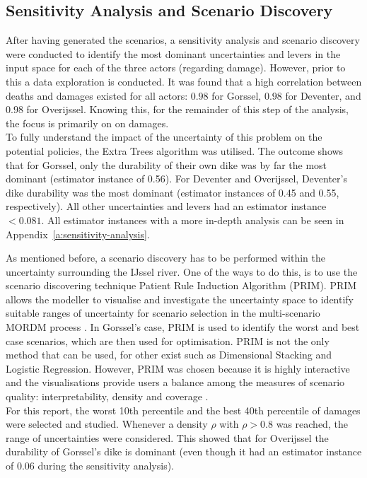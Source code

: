 \subsection{Sensitivity Analysis and Scenario Discovery}
\label{ss:sensitivity-analysis-scenario-discovery}
After having generated the scenarios, a sensitivity analysis and scenario discovery were conducted to identify the most dominant uncertainties and levers in the input space for each of the three actors (regarding damage). However, prior to this a data exploration is conducted. It was found that a high correlation between deaths and damages existed for all actors: $0.98$ for Gorssel, $0.98$ for Deventer, and $0.98$ for Overijssel. Knowing this, for the remainder of this step of the analysis, the focus is primarily on on damages. \\

\noindent To fully understand the impact of the uncertainty of this problem on the potential policies, the Extra Trees algorithm was utilised. The outcome shows that for Gorssel, only the durability of their own dike was by far the most dominant (estimator instance of 0.56). For Deventer and Overijssel, Deventer's dike durability was the most dominant (estimator instances of 0.45 and 0.55, respectively). All other uncertainties and levers had an estimator instance $<0.081$. All estimator instances with a more in-depth analysis can be seen in Appendix~\ref{a:sensitivity-analysis}.

As mentioned before, a scenario discovery has to be performed within the uncertainty surrounding the IJssel river. One of the ways to do this, is to use the scenario discovering technique Patient Rule Induction Algorithm (PRIM). PRIM allows the modeller to visualise and investigate the uncertainty space to identify suitable ranges of uncertainty for scenario selection in the multi-scenario MORDM process \parencite{bryant_thinking_2010}. In Gorssel's case, PRIM is used to identify the worst and best case scenarios, which are then used for optimisation. PRIM is not the only method that can be used, for other exist such as Dimensional Stacking and Logistic Regression. However, PRIM was chosen because it is highly interactive and the visualisations provide users a balance among the measures of scenario quality: interpretability, density and coverage \parencite{bryant_thinking_2010}. \\

\noindent For this report, the worst 10th percentile and the best 40th percentile of damages were selected and studied. Whenever a density $\rho$ with $\rho>0.8$ was reached, the range of uncertainties were considered. This showed that for Overijssel the durability of Gorssel's dike is dominant (even though it had an estimator instance of 0.06 during the sensitivity analysis).


